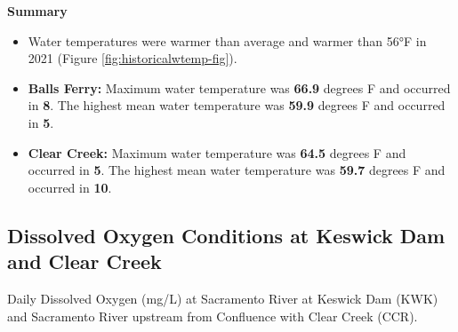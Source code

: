 \documentclass[
]{book}
\providecommand{\tightlist}{%
  \setlength{\itemsep}{0pt}\setlength{\parskip}{0pt}}
\theoremstyle{definition}
\theoremstyle{definition}
\theoremstyle{definition}
\theoremstyle{definition}
\theoremstyle{remark}
\begin{document}
\textbf{Summary}

\begin{itemize}
\tightlist
\item
  Water temperatures were warmer than average and warmer than 56°F in 2021 (Figure \ref{fig:historicalwtemp-fig}).
\item
  \textbf{Balls Ferry:} Maximum water temperature was \textbf{66.9} degrees F and occurred in \textbf{8}. The highest mean water temperature was \textbf{59.9} degrees F and occurred in \textbf{5}.
\item
  \textbf{Clear Creek:} Maximum water temperature was \textbf{64.5} degrees F and occurred in \textbf{5}. The highest mean water temperature was \textbf{59.7} degrees F and occurred in \textbf{10}.
\end{itemize}

\hypertarget{dissolved-oxygen-conditions-at-keswick-dam-and-clear-creek}{%
\subsection{Dissolved Oxygen Conditions at Keswick Dam and Clear Creek}\label{dissolved-oxygen-conditions-at-keswick-dam-and-clear-creek}}

\label{fig:KWKCCRDO-fig}Daily Dissolved Oxygen (mg/L) at Sacramento River at Keswick Dam (KWK) and Sacramento River upstream from Confluence with Clear Creek (CCR).
\end{document}

